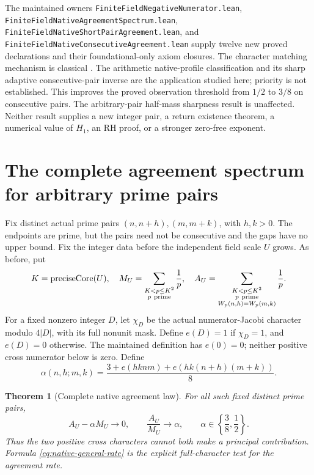 \documentclass[11pt]{article}
\newtheorem{theorem}{Theorem}[section]
\begin{document}
The maintained owners \texttt{FiniteFieldNegativeNumerator.lean},
\texttt{FiniteFieldNativeAgreementSpectrum.lean},
\texttt{FiniteFieldNativeShortPairAgreement.lean}, and
\texttt{FiniteFieldNativeConsecutiveAgreement.lean} supply twelve
new proved declarations and their foundational-only axiom closures.
The character matching mechanism is classical
\cite{WaljiMatchingDensities}. The arithmetic native-profile
classification and its sharp adaptive consecutive-pair inverse
are the application studied here; priority is not established.
This improves the proved observation threshold from \(1/2\)
to \(3/8\) on consecutive pairs. The arbitrary-pair half-mass
sharpness result is unaffected. Neither result supplies a new
integer pair, a return existence theorem, a numerical value of
\(H_1\), an RH proof, or a stronger zero-free exponent.

\section{The complete agreement spectrum for arbitrary prime pairs}
\label{sec:native-general-spectrum}
Fix distinct actual prime pairs \((n,n+h),(m,m+k)\), with \(h,k>0\).
The endpoints are prime, but the pairs need not be consecutive and the
gaps have no upper bound. Fix the integer data before the independent
field scale \(U\) grows. As before, put
\[
 K=\operatorname{preciseCore}(U),\quad
 M_U=\sum_{\substack{K<p\le K^2\\p\ {\rm prime}}}\frac1p,\quad
 A_U=\sum_{\substack{K<p\le K^2\\p\ {\rm prime}\\
                    W_p(n,h)=W_p(m,k)}}\frac1p.
\]
For a fixed nonzero integer \(D\), let \(\chi_D\) be the actual
numerator-Jacobi character modulo \(4|D|\), with its full nonunit mask.
Define \(e(D)=1\) if \(\chi_D=1\), and \(e(D)=0\) otherwise.
The maintained definition has \(e(0)=0\); neither positive cross
numerator below is zero. Define
\begin{equation}\label{eq:native-general-rate}
 \alpha(n,h;m,k)=\frac{3+e(hknm)+e(hk(n+h)(m+k))}{8}.
\end{equation}

\begin{theorem}[Complete native agreement law]
\label{thm:native-general-spectrum}
For all such fixed distinct prime pairs,
\[
 A_U-\alpha M_U\longrightarrow0,\qquad
 \frac{A_U}{M_U}\longrightarrow\alpha,\qquad
 \alpha\in\left\{\frac38,\frac12\right\}.
\]
Thus the two positive cross characters cannot both make a principal
contribution. Formula \eqref{eq:native-general-rate} is the explicit
full-character test for the agreement rate.
\end{theorem}
\end{document}
